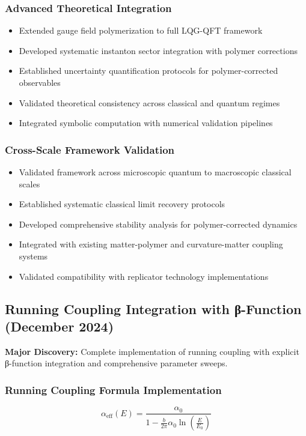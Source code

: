 \documentclass[11pt]{article}
\begin{document}
\subsubsection{Advanced Theoretical Integration}
\begin{itemize}
    \item Extended gauge field polymerization to full LQG-QFT framework
    \item Developed systematic instanton sector integration with polymer corrections
    \item Established uncertainty quantification protocols for polymer-corrected observables
    \item Validated theoretical consistency across classical and quantum regimes
    \item Integrated symbolic computation with numerical validation pipelines
\end{itemize}

\subsubsection{Cross-Scale Framework Validation}
\begin{itemize}
    \item Validated framework across microscopic quantum to macroscopic classical scales
    \item Established systematic classical limit recovery protocols
    \item Developed comprehensive stability analysis for polymer-corrected dynamics
    \item Integrated with existing matter-polymer and curvature-matter coupling systems
    \item Validated compatibility with replicator technology implementations
\end{itemize}

\subsection{Running Coupling Integration with β-Function (December 2024)}

\textbf{Major Discovery:} Complete implementation of running coupling with explicit β-function integration and comprehensive parameter sweeps.

\subsubsection{Running Coupling Formula Implementation}
\begin{equation}
\alpha_{\text{eff}}(E) = \frac{\alpha_0}{1 - \frac{b}{2\pi} \alpha_0 \ln\left(\frac{E}{E_0}\right)}
\end{equation}
\end{document}
